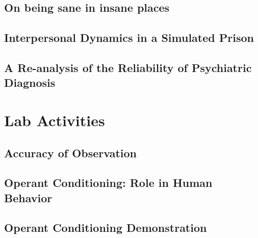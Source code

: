\begin{refsection}
\begin{appendices}
\subsection{On being sane in insane places}
\label{onbeingsaneininsaneplaces}

\label{paper: rosenhan}


\subsection{Interpersonal Dynamics in a Simulated Prison}
\label{interpersonaldynamicsinasimulatedprison}

\label{paper: zimbardo}


\subsection{A Re-analysis of the Reliability of Psychiatric Diagnosis}
\label{are-analysisofthereliabilityofpsychiatricdiagnosis}

\label{paper: spitzer}


\section{Lab Activities}
\label{labactivities}

\subsection{Accuracy of Observation}
\label{accuracyofobservation}

\label{app: observation}


\subsection{Operant Conditioning: Role in Human Behavior}
\label{operantconditioning:roleinhumanbehavior}

\label{app: operantconditioning-humans}


\subsection{Operant Conditioning Demonstration}
\label{operantconditioningdemonstration}


\end{appendices}
\end{refsection}
